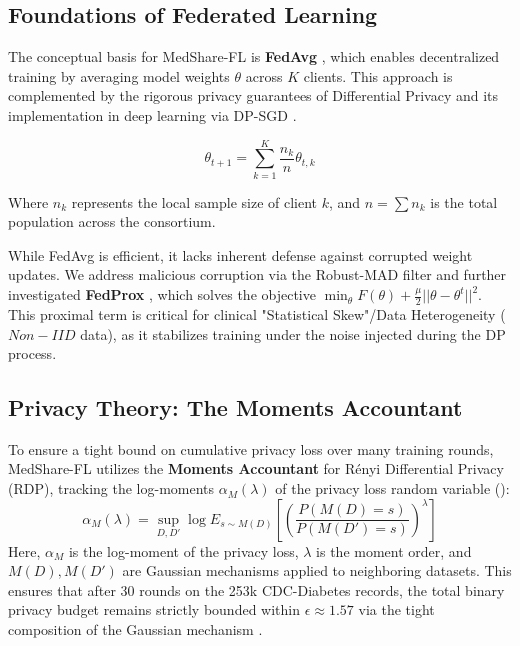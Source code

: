 \documentclass[10pt, a4paper, twocolumn]{article}
\begin{document}
\subsection{Foundations of Federated Learning}
The conceptual basis for MedShare-FL is \textbf{FedAvg} \cite{mcmahan2017}, which enables decentralized training by averaging model weights $\theta$ across $K$ clients. This approach is complemented by the rigorous privacy guarantees of Differential Privacy \cite{dwork2006} and its implementation in deep learning via DP-SGD \cite{abadi2016}.

\begin{equation}
    \theta_{t+1} = \sum_{k=1}^K \frac{n_k}{n} \theta_{t,k}
\end{equation}

Where $n_k$ represents the local sample size of client $k$, and $n = \sum n_k$ is the total population across the consortium.

While FedAvg is efficient, it lacks inherent defense against corrupted weight updates. We address malicious corruption via the Robust-MAD filter and further investigated \textbf{FedProx} \cite{li2020}, which solves the objective $\min_{\theta} F(\theta) + \frac{\mu}{2} ||\theta - \theta^t||^2$. This proximal term is critical for clinical "Statistical Skew"/Data Heterogeneity ($Non-IID$ data), as it stabilizes training under the noise injected during the DP process.

\subsection{Privacy Theory: The Moments Accountant}
To ensure a tight bound on cumulative privacy loss over many training rounds, MedShare-FL utilizes the \textbf{Moments Accountant} for Rényi Differential Privacy (RDP), tracking the log-moments $\alpha_M(\lambda)$ of the privacy loss random variable (\cite{abadi2016}):
\begin{equation}
    \alpha_M(\lambda) = \sup_{D, D'} \log E_{s \sim M(D)} [ (\frac{P(M(D)=s)}{P(M(D')=s)})^{\lambda} ]
\end{equation}
Here, $\alpha_M$ is the log-moment of the privacy loss, $\lambda$ is the moment order, and $M(D), M(D')$ are Gaussian mechanisms applied to neighboring datasets. This ensures that after 30 rounds on the 253k CDC-Diabetes records, the total binary privacy budget remains strictly bounded within $\epsilon \approx 1.57$ via the tight composition of the Gaussian mechanism \cite{abadi2016}.
\end{document}

